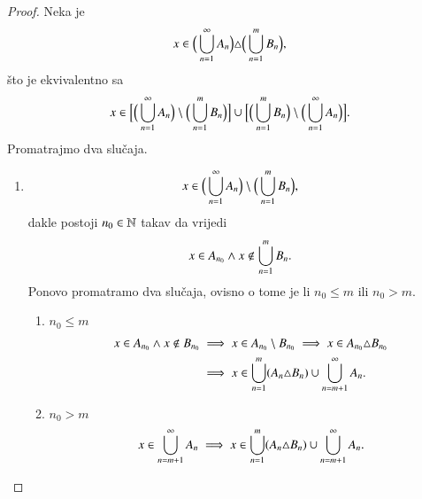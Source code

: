 \begin{rj}[\ref{zad:9.10}]
    \begin{proof}
        Neka je
        \begin{equation*}
            x \in \Big( \bigcup\limits_{n = 1}^{\infty} A_n \Big) \triangle \Big( \bigcup\limits_{n = 1}^{m} B_n \Big),
        \end{equation*}
        \v sto je ekvivalentno sa
        \begin{equation*}
            x \in \Big[ \Big( \bigcup\limits_{n = 1}^{\infty} A_n \Big) \setminus \Big( \bigcup\limits_{n = 1}^{m} B_n \Big) \Big] \cup \Big[ \Big( \bigcup\limits_{n = 1}^{m} B_n \Big) \setminus \Big( \bigcup\limits_{n = 1}^{\infty} A_n \Big) \Big].
        \end{equation*}
        Promatrajmo dva slu\v caja.
        \begin{enumerate}[label=(\roman*)]
            \item
            \begin{equation*}
                x \in \Big( \bigcup\limits_{n = 1}^{\infty} A_n \Big) \setminus \Big( \bigcup\limits_{n = 1}^{m} B_n \Big),
            \end{equation*}
            dakle postoji $n_0 \in \mathbb{N}$ takav da vrijedi
            \begin{equation*}
                x \in A_{n_0} \land x \notin \bigcup\limits_{n = 1}^{m} B_n.
            \end{equation*}
            Ponovo promatramo dva slu\v caja, ovisno o tome je li $n_0 \leq m$ ili $n_0 > m$.
            \begin{enumerate}[label=(\alph*)]
                \item $n_0 \leq m$
                \begin{equation*}
                    \begin{aligned}
                        x \in A_{n_0} \land x \notin B_{n_0} &\implies x \in A_{n_0} \setminus B_{n_0} \implies x \in A_{n_0} \triangle B_{n_0}\\
                        &\implies x \in \bigcup\limits_{n = 1}^{m} (A_n \triangle B_n) \cup \bigcup\limits_{n = m + 1}^{\infty} A_n. 
                    \end{aligned}
                \end{equation*}
                \item $n_0 > m$
                \begin{equation*}
                    x \in \bigcup\limits_{n = m + 1}^{\infty} A_n \implies x \in \bigcup\limits_{n = 1}^{m} (A_n \triangle B_n) \cup \bigcup\limits_{n = m + 1}^{\infty} A_n.
                \end{equation*}
            \end{enumerate}

\end{enumerate}
\end{proof}
\end{rj}
